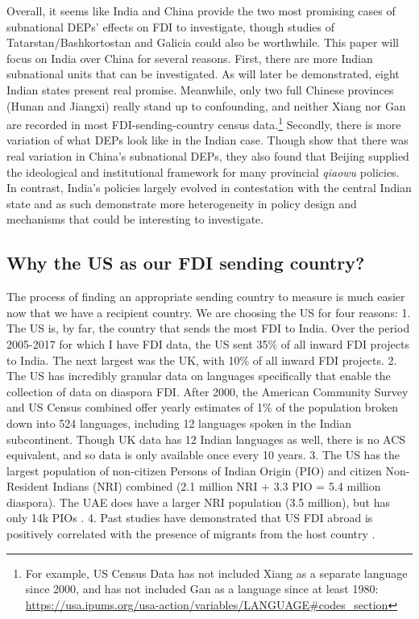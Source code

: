 \documentclass[12pt]{article}
\let\oldsubsection\subsection
\renewcommand{\subsection}{\FloatBarrier\oldsubsection}
\begin{document}
    Overall, it seems like India and China provide the two most promising cases of subnational DEPs' effects on FDI to investigate, though studies of Tatarstan/Bashkortostan and Galicia could also be worthwhile. This paper will focus on India over China for several reasons. First, there are more Indian subnational units that can be investigated. As will later be demonstrated, eight Indian states present real promise. Meanwhile, only two full Chinese provinces (Hunan and Jiangxi) really stand up to confounding, and neither Xiang nor Gan are recorded in most FDI-sending-country census data.\footnote{For example, US Census Data has not included Xiang as a separate language since 2000, and has not included Gan as a language since at least 1980: \url{https://usa.ipums.org/usa-action/variables/LANGUAGE\#codes_section}} Secondly, there is more variation of what DEPs look like in the Indian case. Though \citeauthor{liu_chinas_2016} show that there was real variation in China's subnational DEPs, they also found that Beijing supplied the ideological and institutional framework for many provincial \textit{qiaowu} policies. In contrast, India's policies largely evolved in contestation with the central Indian state \citep{sharma_partisan_2020} and as such demonstrate more heterogeneity in policy design and mechanisms that could be interesting to investigate.

\subsection{Why the US as our FDI sending country?} \label{ss:why the us?}
    The process of finding an appropriate sending country to measure is much easier now that we have a recipient country. We are choosing the US for four reasons:
    1. The US is, by far, the country that sends the most FDI to India. Over the period 2005-2017 for which I have FDI data, the US sent 35\% of all inward FDI projects to India. The next largest was the UK, with 10\% of all inward FDI projects.
    2. The US has incredibly granular data on languages specifically that enable the collection of data on diaspora FDI. After 2000, the American Community Survey and US Census combined offer yearly estimates of 1\% of the population broken down into 524 languages, including 12 languages spoken in the Indian subcontinent. \citep{noauthor_ipums_nodate} Though UK data has 12 Indian languages as well, there is no ACS equivalent, and so data is only available once every 10 years. \citep{service_language_nodate}
    3. The US has the largest population of non-citizen Persons of Indian Origin (PIO) and citizen Non-Resident Indians (NRI) combined (2.1 million NRI + 3.3 PIO = 5.4 million diaspora). The UAE does have a larger NRI population (3.5 million), but has only 14k PIOs \citep{noauthor_population_nodate}.
    4. Past studies have demonstrated that US FDI abroad is positively correlated with the presence of migrants from the host country \citep{javorcik_migrant_2011}.
\end{document}
